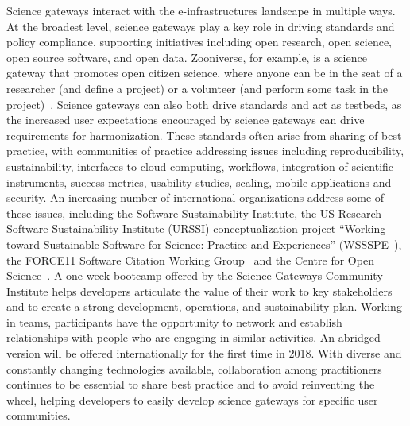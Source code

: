 \documentclass[review]{elsarticle}
\begin{document}
Science gateways interact with the e-infrastructures landscape in multiple ways. At the broadest level, science gateways play a key role in driving standards and policy compliance, supporting initiatives including open research, open science, open source software, and open data.  Zooniverse, for example, is a science gateway that promotes open citizen science, where anyone can be in the seat of a researcher (and define a project) or a volunteer (and perform some task in the project)~\cite{zoo-76}. 
Science gateways can also both drive standards and act as testbeds, as the increased user expectations encouraged by science gateways can drive requirements for harmonization. These standards often arise from sharing of best practice, with communities of practice addressing issues including reproducibility, sustainability, interfaces to cloud computing, workflows, integration of scientific instruments, success metrics, usability studies, scaling, mobile applications and security. 
An increasing number of international organizations address some of these issues, including the Software Sustainability Institute, the US Research Software Sustainability Institute (URSSI) conceptualization project ``Working toward Sustainable Software for Science: Practice and Experiences'' (WSSSPE~\cite{wssspe}), the FORCE11 Software Citation Working Group~\cite{force11-39} and the Centre for Open Science~\cite{cio}. 
A one-week bootcamp offered by the Science Gateways Community Institute helps developers articulate the value of their work to key stakeholders and to create a strong development, operations, and sustainability plan. Working in teams, participants have the opportunity to network and establish relationships with people who are engaging in similar activities. An abridged version will be offered internationally for the first time in 2018. With diverse and constantly changing technologies available, collaboration among practitioners continues to be essential to share best practice and to avoid reinventing the wheel, helping developers to easily develop science gateways for specific user communities.
\end{document}
